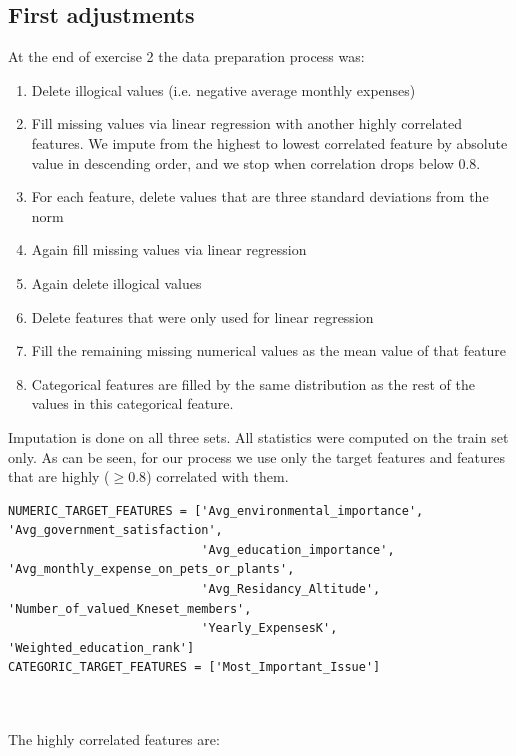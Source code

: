 \documentclass[12pt]{article}
\begin{document}
\subsection{First adjustments}
At the end of exercise 2 the data preparation process was:
\begin{enumerate}
\item Delete illogical values (i.e. negative average monthly expenses)
\item Fill missing values via linear regression with another highly correlated features. We impute from the highest to lowest correlated feature by absolute value in descending order, and we stop when correlation drops below 0.8.
\item For each feature, delete values that are three standard deviations from the norm
\item Again fill missing values via linear regression
\item Again delete illogical values
\item Delete features that were only used for linear regression
\item Fill the remaining missing numerical values as the mean value of that feature
\item Categorical features are filled by the same distribution as the rest of the values in this categorical feature.
\end{enumerate}

Imputation is done on all three sets. All statistics were computed on the train set only. As can be seen, for our process we use only the target features
and features that are highly ($\geq 0.8$) correlated with them.\\

\begin{adjustbox}{max width=\linewidth}
\begin{lstlisting}
NUMERIC_TARGET_FEATURES = ['Avg_environmental_importance', 'Avg_government_satisfaction',
                           'Avg_education_importance', 'Avg_monthly_expense_on_pets_or_plants',
                           'Avg_Residancy_Altitude', 'Number_of_valued_Kneset_members',
                           'Yearly_ExpensesK', 'Weighted_education_rank']
CATEGORIC_TARGET_FEATURES = ['Most_Important_Issue']
\end{lstlisting}
\end{adjustbox}\\\\


The highly correlated features are:\\
\end{document}
